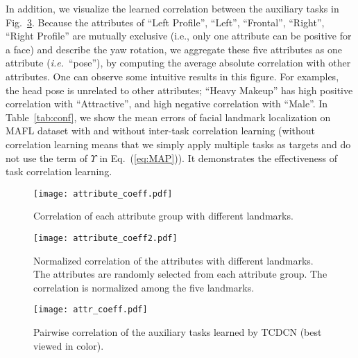 \documentclass[10pt,journal,compsoc]{IEEEtran}
\newcommand{\ie}{\emph{i.e.}~}
\begin{document}
In addition, we visualize the learned correlation between the auxiliary tasks in Fig.~\ref{fig:attr_coeff}. Because the attributes of ``Left Profile'', ``Left'', ``Frontal'', ``Right'', ``Right Profile'' are mutually exclusive (i.e., only one attribute can be positive for a face) and describe the yaw rotation, we aggregate these five attributes as one attribute (\ie ``pose''), by computing the average absolute correlation with other attributes. One can observe some intuitive results in this figure. For examples, the head pose is unrelated to other attributes; ``Heavy Makeup'' has high positive correlation with ``Attractive'', and high negative correlation with ``Male''. In Table~\ref{tab:conf}, we show the mean errors of facial landmark localization on MAFL dataset with and without inter-task correlation learning (without correlation learning means that we simply apply multiple tasks as targets and do not use the term of $\Upsilon$ in Eq.~(\ref{eq:MAP})). It demonstrates the effectiveness of task correlation learning.

\begin{figure}
  \centering
  \texttt{[image: attribute\_coeff.pdf]}
  \vskip -0.35cm
  \caption{Correlation of each attribute group with different landmarks.}
  \label{fig:attribute_coeff}
\end{figure}

\begin{figure}
  \centering
  \texttt{[image: attribute\_coeff2.pdf]}
    \vskip -0.35cm
  \caption{Normalized correlation of the attributes with different landmarks. The attributes are randomly selected from each attribute group. The correlation is normalized among the five landmarks.}
  \label{fig:attribute_coeff2}
  \vskip -0.3cm
\end{figure}





\begin{figure}[t]
  \centering
  \texttt{[image: attr\_coeff.pdf]}
  \vskip -0.3cm
  \caption{Pairwise correlation of the auxiliary tasks learned by TCDCN (best viewed in color).}
  \label{fig:attr_coeff}
  \vskip -0.3cm
\end{figure}
\end{document}
